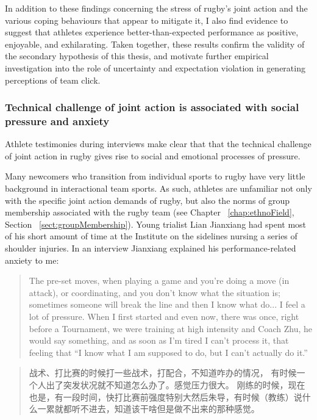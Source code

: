 \begin{CJK}{UTF8}{gbsn}
In addition to these findings concerning the stress of rugby's joint action and the various coping behaviours that appear to mitigate it, I also find evidence to suggest that athletes experience better-than-expected performance as positive, enjoyable, and exhilarating.  Taken together, these results confirm the validity of the secondary hypothesis of this thesis, and motivate further empirical investigation into the role of uncertainty and expectation violation in generating perceptions of team click.


\subsubsection{Technical challenge of joint action is associated with social pressure and anxiety}

Athlete testimonies during interviews make clear that that the technical challenge of joint action in rugby gives rise to social and emotional processes of pressure.

Many newcomers who transition from individual sports to rugby have very little background in interactional team sports.  As such, athletes are unfamiliar not only with the specific joint action demands of rugby, but also the norms of group membership associated with the rugby team (see Chapter ~\ref{chap:ethnoField}, Section ~\ref{sect:groupMembership}).  Young trialist Lian Jianxiang had spent most of his short amount of time at the Institute on the sidelines nursing a series of shoulder injuries. In an interview Jianxiang explained his performance-related anxiety to me:

    \begin{quote}
      The pre-set moves, when playing a game and you're doing a move (in attack), or coordinating, and you don't know what the situation is; sometimes someone will break the line and then I know what do... I feel a lot of pressure.  When I first started and even now, there was once, right before a Tournament, we were training at high intensity and Coach Zhu, he would say something, and as soon as I'm tired I can't process it, that feeling that ``I know what I am supposed to do, but I can't actually do it.''
    \end{quote}

    \begin{quote}
      战术、打比赛的时候打一些战术，打配合，不知道咋办的情况， 有时候一个人出了突发状况就不知道怎么办了。感觉压力很大。 刚练的时候，现在也是，有一段时间，快打比赛前强度特别大然后朱导，有时候（教练）说什么一累就都听不进去，知道该干啥但是做不出来的那种感觉。
    \end{quote}


\end{CJK}
